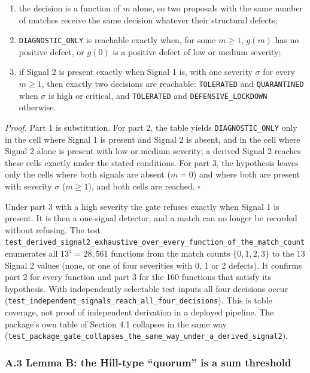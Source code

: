 \documentclass[
  11pt,
]{article}
\newcommand{\passthrough}[1]{#1}
\providecommand{\tightlist}{%
  \setlength{\itemsep}{0pt}\setlength{\parskip}{0pt}}
\begin{document}
\begin{enumerate}
\def\labelenumi{\arabic{enumi}.}
\tightlist
\item
  the decision is a function of \(m\) alone, so two proposals with the
  same number of matches receive the same decision whatever their
  structural defects;
\item
  \texttt{\nolinkurl{DIAGNOSTIC_ONLY}} is reachable exactly when,
  for some \(m \geq 1\), \(g(m)\) has no positive defect, or \(g(0)\) is
  a positive defect of low or medium severity;
\item
  if Signal 2 is present exactly when Signal 1 is, with one severity
  \(\sigma\) for every \(m \geq 1\), then exactly two decisions are
  reachable: \passthrough{\lstinline!TOLERATED!} and
  \passthrough{\lstinline!QUARANTINED!} when \(\sigma\) is high or
  critical, and \passthrough{\lstinline!TOLERATED!} and
  \texttt{\nolinkurl{DEFENSIVE_LOCKDOWN}} otherwise.
\end{enumerate}

\emph{Proof.} Part 1 is substitution. For part 2, the table yields
\texttt{\nolinkurl{DIAGNOSTIC_ONLY}} only in the cell where Signal
1 is present and Signal 2 is absent, and in the cell where Signal 2
alone is present with low or medium severity; a derived Signal 2 reaches
these cells exactly under the stated conditions. For part 3, the
hypothesis leaves only the cells where both signals are absent
(\(m = 0\)) and where both are present with severity \(\sigma\)
(\(m \geq 1\)), and both cells are reached. \(\square\)

Under part 3 with a high severity the gate refuses exactly when Signal 1
is present. It is then a one-signal detector, and a match can no longer
be recorded without refusing. The test
\texttt{\nolinkurl{test_derived_signal2_exhaustive_over_every_function_of_the_match_count}}
enumerates all \(13^4 = 28{,}561\) functions from the match counts
\(\{0, 1, 2, 3\}\) to the 13 Signal 2 values (none, or one of four
severities with 0, 1 or 2 defects). It confirms part 2 for every
function and part 3 for the 160 functions that satisfy its hypothesis.
With independently selectable test inputs all four decisions occur
(\texttt{\nolinkurl{test_independent_signals_reach_all_four_decisions}}).
This is table coverage, not proof of independent derivation in a
deployed pipeline. The package's own table of Section 4.1 collapses in
the same way
(\texttt{\nolinkurl{test_package_gate_collapses_the_same_way_under_a_derived_signal2}}).

\hypertarget{a.3-lemma-b-the-hill-type-quorum-is-a-sum-threshold}{%
\subsubsection{A.3 Lemma B: the Hill-type ``quorum'' is a sum
threshold}\label{a.3-lemma-b-the-hill-type-quorum-is-a-sum-threshold}}
\end{document}

